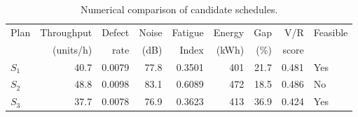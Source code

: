 \begin{table}[htbp]
\centering
\caption{Numerical comparison of candidate schedules.}
\label{tab:numerical-sim}
\small
\begin{tabular}{@{}lrrrrrrrl@{}}
\toprule
Plan & Throughput & Defect & Noise & Fatigue & Energy & Gap & V/R & Feasible \\
     & (units/h)  & rate   & (dB)  & Index   & (kWh)  & (\%) & score &         \\
\midrule
$S_{1}$ & 40.7 & 0.0079 & 77.8 & 0.3501 & 401 & 21.7 & 0.481 & Yes \\
$S_{2}$ & 48.8 & 0.0098 & 83.1 & 0.6089 & 472 & 18.5 & 0.486 & No \\
$S_{3}$ & 37.7 & 0.0078 & 76.9 & 0.3623 & 413 & 36.9 & 0.424 & Yes \\
\bottomrule
\end{tabular}
\end{table}
